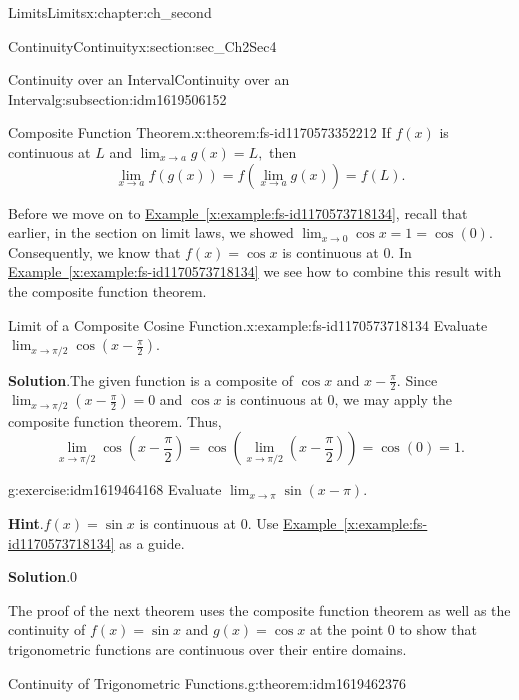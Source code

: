 \documentclass[oneside,10pt,]{book}
\newcommand{\blocktitlefont}{\relax}
\newcommand{\xreffont}{\relax}
\numberwithin{equation}{section}
\begin{document}
\begin{chapterptx}{Limits}{}{Limits}{}{}{x:chapter:ch_second}
\begin{sectionptx}{Continuity}{}{Continuity}{}{}{x:section:sec_Ch2Sec4}
\begin{subsectionptx}{Continuity over an Interval}{}{Continuity over an Interval}{}{}{g:subsection:idm1619506152}
\begin{theorem}{Composite Function Theorem.}{}{x:theorem:fs-id1170573352212}%
If \(f(x)\) is continuous at \(L\) and \(\lim_{x\to a}g(x)=L,\) then%
%
\begin{equation*}
\lim_{x\to a}f(g(x))=f(\lim_{x\to a}g(x))=f(L).
\end{equation*}
\end{theorem}
Before we move on to \hyperref[x:example:fs-id1170573718134]{Example~{\xreffont\ref{x:example:fs-id1170573718134}}}, recall that earlier, in the section on limit laws, we showed \(\lim_{x\to 0}\cos  x=1=\cos  (0).\) Consequently, we know that \(f(x)=\cos  x\) is continuous at 0. In \hyperref[x:example:fs-id1170573718134]{Example~{\xreffont\ref{x:example:fs-id1170573718134}}} we see how to combine this result with the composite function theorem.%
\begin{example}{Limit of a Composite Cosine Function.}{x:example:fs-id1170573718134}%
Evaluate \(\lim_{x\to \pi/2}\cos  (x-\frac{\pi}{2}).\)%
\par\smallskip%
\noindent\textbf{\blocktitlefont Solution}.\hypertarget{g:solution:idm1619468776}{}\quad{}The given function is a composite of \(\cos  x\) and \(x-\frac{\pi}{2}.\) Since \(\lim_{x\to \pi/2}(x-\frac{\pi}{2})=0\) and \(\cos  x\) is continuous at 0, we may apply the composite function theorem. Thus,%
%
\begin{equation*}
\lim_{x\to \pi/2}\cos  (x-\frac{\pi}{2})=\cos  (\lim_{x\to \pi/2}(x-\frac{\pi}{2}))=\cos  (0)=1.
\end{equation*}
\end{example}
\begin{inlineexercise}{}{g:exercise:idm1619464168}%
Evaluate \(\lim_{x\to \pi}\sin (x-\pi).\)%
\par\smallskip%
\noindent\textbf{\blocktitlefont Hint}.\hypertarget{g:hint:idm1619466600}{}\quad{}\(f(x)=\sin x\) is continuous at 0. Use \hyperref[x:example:fs-id1170573718134]{Example~{\xreffont\ref{x:example:fs-id1170573718134}}} as a guide.%
\par\smallskip%
\noindent\textbf{\blocktitlefont Solution}.\hypertarget{g:solution:idm1619465960}{}\quad{}0%
\end{inlineexercise}%
The proof of the next theorem uses the composite function theorem as well as the continuity of \(f(x)=\sin x\) and \(g(x)=\cos  x\) at the point 0 to show that trigonometric functions are continuous over their entire domains.%
\begin{theorem}{Continuity of Trigonometric Functions.}{}{g:theorem:idm1619462376}%

\end{theorem}
\end{subsectionptx}
\end{sectionptx}
\end{chapterptx}
\end{document}
